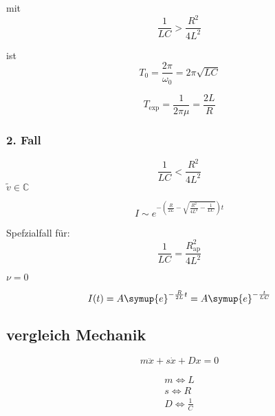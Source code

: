         mit 
        \begin{equation}
            \frac{1}{LC} > \frac{R^2}{4L^2}
        \end{equation}

        ist
        \begin{equation}
            T_0 = \frac{2\pi}{\omega_0} = 2\pi \sqrt{LC}
        \end{equation}

        \begin{equation}
            T_{\text{exp}} = \frac{1}{2 \pi \mu } = \frac{2L}{R}
        \end{equation}

        \subsubsection{2. Fall}

        \begin{equation}
            \frac{1}{LC} < \frac{R^2}{4L^2}
        \end{equation}
        $\tilde{v} \in \mathds{C}$

        \begin{equation}
            I \sim e^{- \left( \frac{R}{2L} - \sqrt{\frac{R^2}{4L^2} - \frac{1}{LC}}\right) t}
        \end{equation}

        Spefzialfall für:
        \begin{equation}
            \frac{1}{LC} = \frac{R^2_{\text{ap}}}{4L^2}
        \end{equation}

        $\nu = 0$

        \begin{equation}
            I(t) = A \symup{e}^{-\frac{R}{2L}t} = A \symup{e}^{-\frac{t}{LC}}
        \end{equation}

        \subsection{vergleich Mechanik}

        \begin{equation}
            m \ddot{x} + s \dot{x} + Dx = 0
        \end{equation}

        \begin{align}
            m \Leftrightarrow L \\
            s \Leftrightarrow R \\
            D \Leftrightarrow \frac{1}{C}
        \end{align}

